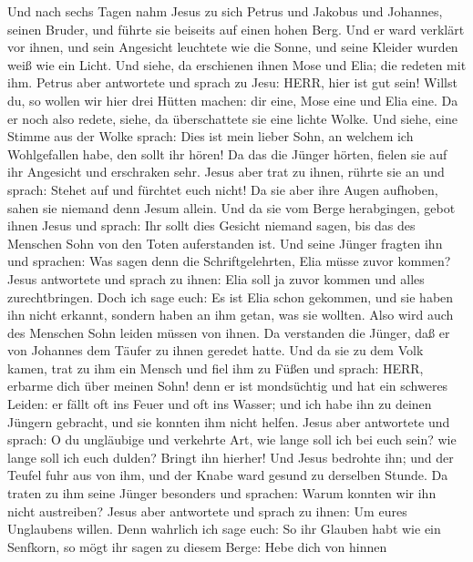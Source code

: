  Und nach sechs Tagen nahm Jesus zu sich Petrus und Jakobus
und Johannes, seinen Bruder, und führte sie beiseits auf einen hohen
Berg.  Und er ward verklärt vor ihnen, und sein Angesicht
leuchtete wie die Sonne, und seine Kleider wurden weiß wie ein Licht.
 Und siehe, da erschienen ihnen Mose und Elia; die redeten
mit ihm.  Petrus aber antwortete und sprach zu Jesu: HERR,
hier ist gut sein! Willst du, so wollen wir hier drei Hütten machen: dir
eine, Mose eine und Elia eine.  Da er noch also redete,
siehe, da überschattete sie eine lichte Wolke. Und siehe, eine Stimme
aus der Wolke sprach: Dies ist mein lieber Sohn, an welchem ich
Wohlgefallen habe, den sollt ihr hören!  Da das die Jünger
hörten, fielen sie auf ihr Angesicht und erschraken sehr. 
Jesus aber trat zu ihnen, rührte sie an und sprach: Stehet auf und
fürchtet euch nicht!  Da sie aber ihre Augen aufhoben, sahen
sie niemand denn Jesum allein.  Und da sie vom Berge
herabgingen, gebot ihnen Jesus und sprach: Ihr sollt dies Gesicht
niemand sagen, bis das des Menschen Sohn von den Toten auferstanden ist.
 Und seine Jünger fragten ihn und sprachen: Was sagen denn
die Schriftgelehrten, Elia müsse zuvor kommen?  Jesus
antwortete und sprach zu ihnen: Elia soll ja zuvor kommen und alles
zurechtbringen.  Doch ich sage euch: Es ist Elia schon
gekommen, und sie haben ihn nicht erkannt, sondern haben an ihm getan,
was sie wollten. Also wird auch des Menschen Sohn leiden müssen von
ihnen.  Da verstanden die Jünger, daß er von Johannes dem
Täufer zu ihnen geredet hatte.  Und da sie zu dem Volk
kamen, trat zu ihm ein Mensch und fiel ihm zu Füßen  und
sprach: HERR, erbarme dich über meinen Sohn! denn er ist mondsüchtig und
hat ein schweres Leiden: er fällt oft ins Feuer und oft ins Wasser;
 und ich habe ihn zu deinen Jüngern gebracht, und sie
konnten ihm nicht helfen.  Jesus aber antwortete und
sprach: O du ungläubige und verkehrte Art, wie lange soll ich bei euch
sein? wie lange soll ich euch dulden? Bringt ihn hierher! 
Und Jesus bedrohte ihn; und der Teufel fuhr aus von ihm, und der Knabe
ward gesund zu derselben Stunde.  Da traten zu ihm seine
Jünger besonders und sprachen: Warum konnten wir ihn nicht austreiben?
 Jesus aber antwortete und sprach zu ihnen: Um eures
Unglaubens willen. Denn wahrlich ich sage euch: So ihr Glauben habt wie
ein Senfkorn, so mögt ihr sagen zu diesem Berge: Hebe dich von hinnen
